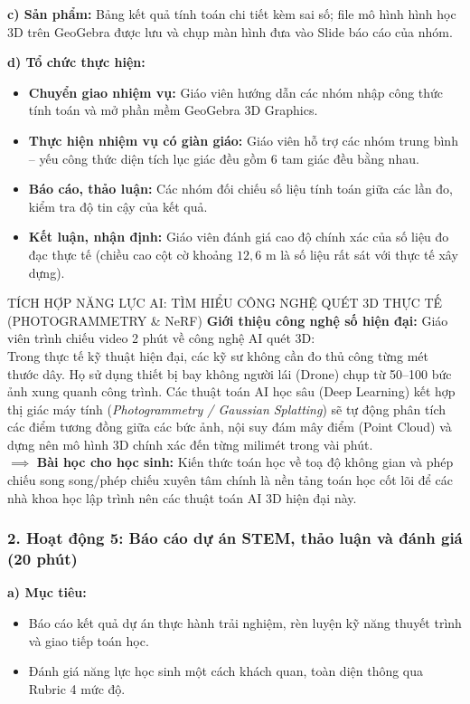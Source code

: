 \documentclass[12pt, a4paper]{article}
\begin{document}
\noindent \textbf{c) Sản phẩm:}
Bảng kết quả tính toán chi tiết kèm sai số; file mô hình hình học 3D trên GeoGebra được lưu và chụp màn hình đưa vào Slide báo cáo của nhóm.

\noindent \textbf{d) Tổ chức thực hiện:}
\begin{itemize}[leftmargin=0.6cm]
    \item \textbf{Chuyển giao nhiệm vụ:} Giáo viên hướng dẫn các nhóm nhập công thức tính toán và mở phần mềm GeoGebra 3D Graphics.
    \item \textbf{Thực hiện nhiệm vụ có giàn giáo:} Giáo viên hỗ trợ các nhóm trung bình -- yếu công thức diện tích lục giác đều gồm 6 tam giác đều bằng nhau.
    \item \textbf{Báo cáo, thảo luận:} Các nhóm đối chiếu số liệu tính toán giữa các lần đo, kiểm tra độ tin cậy của kết quả.
    \item \textbf{Kết luận, nhận định:} Giáo viên đánh giá cao độ chính xác của số liệu đo đạc thực tế (chiều cao cột cờ khoảng $12{,}6\text{ m}$ là số liệu rất sát với thực tế xây dựng).
\end{itemize}

\begin{aibox}{TÍCH HỢP NĂNG LỰC AI: TÌM HIỂU CÔNG NGHỆ QUÉT 3D THỰC TẾ (PHOTOGRAMMETRY \& NeRF)}
\textbf{Giới thiệu công nghệ số hiện đại:} Giáo viên trình chiếu video 2 phút về công nghệ AI quét 3D:\\
Trong thực tế kỹ thuật hiện đại, các kỹ sư không cần đo thủ công từng mét thước dây. Họ sử dụng thiết bị bay không người lái (Drone) chụp từ 50--100 bức ảnh xung quanh công trình. Các thuật toán AI học sâu (Deep Learning) kết hợp thị giác máy tính (\textit{Photogrammetry / Gaussian Splatting}) sẽ tự động phân tích các điểm tương đồng giữa các bức ảnh, nội suy đám mây điểm (Point Cloud) và dựng nên mô hình 3D chính xác đến từng milimét trong vài phút.\\
$\implies$ \textbf{Bài học cho học sinh:} Kiến thức toán học về toạ độ không gian và phép chiếu song song/phép chiếu xuyên tâm chính là nền tảng toán học cốt lõi để các nhà khoa học lập trình nên các thuật toán AI 3D hiện đại này.
\end{aibox}

\subsubsection*{2. Hoạt động 5: Báo cáo dự án STEM, thảo luận và đánh giá (20 phút)}

\noindent \textbf{a) Mục tiêu:}
\begin{itemize}[leftmargin=0.6cm]
    \item Báo cáo kết quả dự án thực hành trải nghiệm, rèn luyện kỹ năng thuyết trình và giao tiếp toán học.
    \item Đánh giá năng lực học sinh một cách khách quan, toàn diện thông qua Rubric 4 mức độ.
\end{itemize}
\end{document}

